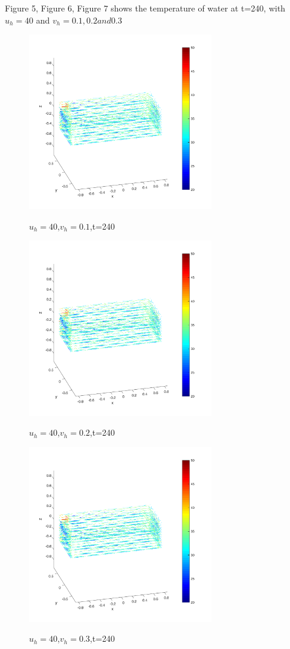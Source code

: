 \documentclass[12pt,a4paper,titlepage]{article}
\begin{document}
Figure 5, Figure 6, Figure 7 shows the temperature of water at t=240, with $u_h=40$ and $v_h=0.1, 0.2 and 0.3$
\begin{figure}[htb]
  \centering
  \includegraphics[width=8cm]{6-2.pdf}\\
  \caption{$u_h=40$,$v_h=0.1$,t=240}\label{6-2_p}
\end{figure}

\begin{figure}[htb]
  \centering
  \includegraphics[width=8cm]{10-2.pdf}\\
  \caption{$u_h=40$,$v_h=0.2$,t=240}\label{10-2_p}
\end{figure}

\begin{figure}[htb]
  \centering
  \includegraphics[width=8cm]{11-2.pdf}\\
  \caption{$u_h=40$,$v_h=0.3$,t=240}\label{11-2_p}
\end{figure}
\end{document}
